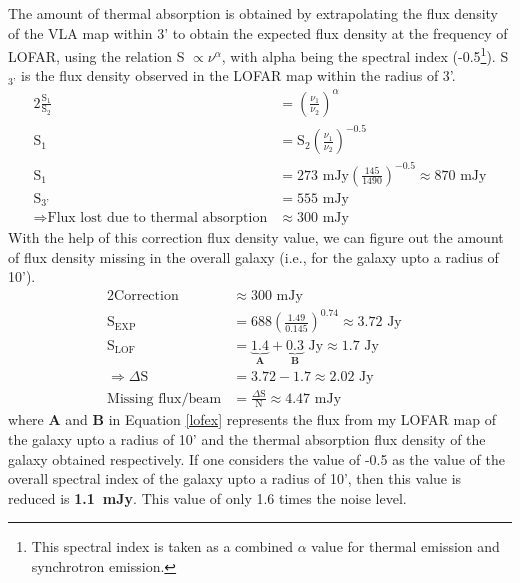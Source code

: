 \documentclass[../main/thesis_msc.tex]{subfiles}
\begin{document}
The amount of thermal absorption is obtained by extrapolating the flux density of the VLA map within 3' to obtain the expected flux density at the frequency of LOFAR, using the relation S $\propto \nu^{\alpha}$, with alpha being the spectral index (-0.5\footnote{This spectral index is taken as a combined $\alpha$ value for thermal emission and synchrotron emission.}). S$_{\text{3'}}$ is the flux density observed in the LOFAR map within the radius of 3'.
\begin{alignat}{2}
\frac{\textrm{S}_1}{\textrm{S}_2} 
&= \left(\frac{\nu_1}{\nu_2}\right)^{\alpha}\\
\textrm{S}_1
&= \textrm{S}_2 \left(\frac{\nu_1}{\nu_2}\right)^{-0.5}\\
\textrm{S}_1 & =273\text{~mJy} \left(\frac{145}{1490}\right)^{-0.5} \approx 870\text{~mJy}\\
\text{S}_{\text{3'}} 
&=555\text{~mJy} \\
\Rightarrow \text{Flux lost due to thermal absorption} 
& \approx 300 \text{~mJy}
\end{alignat}
With the help of this correction flux density value, we can figure out the amount of flux density missing in the overall galaxy (i.e., for the galaxy upto a radius of 10'). 
\begin{alignat}{2}
  \textrm{Correction} 
  &\approx 300\text{~mJy}\\
  \text{S}_{\textrm{EXP}}
  &=688\left(\frac{1.49}{0.145}\right)^{0.74}
  \approx 3.72\text{~Jy}&\\
  \text{S}_{\textrm{LOF}}
  &=\underbrace{1.4}_{\textbf{A}} + \underbrace{0.3}_{\textbf{B}} \text{~Jy}  \approx 1.7 \text{~Jy}& \label{lofex}\\
  \Rightarrow \Delta\text{S} &=3.72-1.7 \approx 2.02  \text{~Jy}\\
  \text{Missing flux/beam} &=\frac{\Delta\text{S}}{\text{N}}\approx 4.47\text{~mJy}&
\end{alignat}
where \textbf{A} and \textbf{B} in Equation \ref{lofex} represents the flux from my LOFAR map of the galaxy upto a radius of 10' and the thermal absorption flux density of the galaxy obtained respectively. If one considers the value of -0.5 as the value of the overall spectral index of the galaxy upto a radius of 10', then this value is reduced is \textbf{1.1~mJy}. This value of only 1.6 times the noise level.\\
\end{document}
